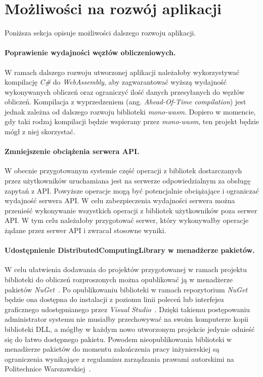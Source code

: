 \documentclass[a4paper,11pt,twoside]{report}
\theoremstyle{definition}
\begin{document}
    \section{Możliwości na rozwój aplikacji}
        \label{mozliwosci-na-rozwoj-aplikacji}
        Poniższa sekcja opisuje możliwości dalszego rozwoju aplikacji.
    
        \paragraph{Poprawienie wydajności węzłów obliczeniowych.}
        W ramach dalszego rozwoju utworzonej aplikacji należałoby wykorzystywać kompilację \textit{C\#} do \textit{WebAssembly}, aby zagwarantować wyższą wydajność wykonywanych obliczeń oraz ograniczyć ilość danych przesyłanych do węzłów obliczeń. Kompilacja z wyprzedzeniem (ang. \textit{Ahead-Of-Time compilation}) jest jednak zależna od dalszego rozwoju biblioteki \textit{mono-wasm}. Dopiero w momencie, gdy taki rodzaj kompilacji będzie wspierany przez \textit{mono-wasm}, ten projekt będzie mógł z niej skorzystać.
        
        \paragraph{Zmniejszenie obciążenia serwera API.}
        W obecnie przygotowanym systemie część operacji z bibliotek dostarczanych przez użytkowników uruchamiana jest na serwerze odpowiedzialnym za obsługę zapytań z API. Powyższe operacje mogą być potencjalnie obciążające i ograniczać wydajność serwera API. W celu zabezpieczenia wydajności serwera można przenieść wykonywanie wszystkich operacji z bibliotek użytkowników poza serwer API. W tym celu należałoby przygotować serwer, który wykonywałby operacje żądane przez serwer API i zwracał stosowne wyniki.
        
        \paragraph{Udostępnienie DistributedComputingLibrary w menadżerze pakietów.}
        W celu ułatwienia dodawania do projektów przygotowanej w ramach projektu biblioteki do obliczeń rozproszonych można opublikować ją w menadżerze pakietów \textit{NuGet}~\cite{nuget}. Po opublikowaniu biblioteki w ramach repozytorium \textit{NuGet} będzie ona dostępna do instalacji z poziomu linii poleceń lub interfejsu graficznego udostępnianego przez \textit{Visual Studio}~\cite{visual-studio}.
        Dzięki takiemu postępowaniu administrator systemu nie musiałby przechowywać na swoim komputerze kopii biblioteki DLL, a mógłby w każdym nowo utworzonym projekcie jedynie odnieść się do łatwo dostępnego pakietu.
        Powodem nieopublikowania biblioteki w menadżerze pakietów do momentu zakończenia pracy inżynierskiej są ograniczenia wynikające z regulaminu zarządzania prawami autorskimi na Politechnice Warszawskiej~\cite{uchwala-prawa-autorskie}.
        
\end{document}
